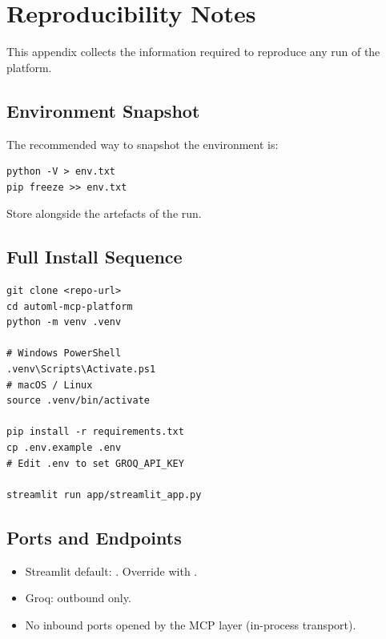 \chapter{Reproducibility Notes}
\label{app:repro}

This appendix collects the information required to reproduce any run
of the platform.

\section{Environment Snapshot}
\label{sec:env-snapshot}

The recommended way to snapshot the environment is:

\begin{lstlisting}[style=alBash, numbers=none]
python -V > env.txt
pip freeze >> env.txt
\end{lstlisting}

Store  alongside the artefacts of the run.

\section{Full Install Sequence}
\label{sec:install}

\begin{lstlisting}[style=alBash, numbers=none]
git clone <repo-url>
cd automl-mcp-platform
python -m venv .venv

# Windows PowerShell
.venv\Scripts\Activate.ps1
# macOS / Linux
source .venv/bin/activate

pip install -r requirements.txt
cp .env.example .env
# Edit .env to set GROQ_API_KEY

streamlit run app/streamlit_app.py
\end{lstlisting}

\section{Ports and Endpoints}
\label{sec:ports}

\begin{itemize}[leftmargin=1.4em]
  \item Streamlit default: . Override with
        .
  \item Groq:  outbound only.
  \item No inbound ports opened by the MCP layer (in-process
        transport).
\end{itemize}

